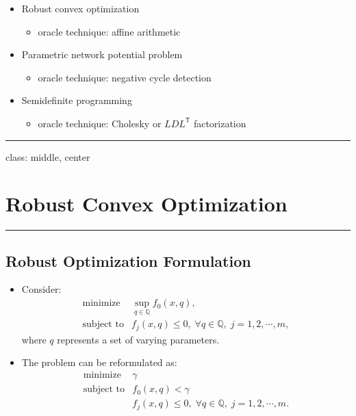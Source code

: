\documentclass[
]{article}
\providecommand{\tightlist}{%
  \setlength{\itemsep}{0pt}\setlength{\parskip}{0pt}}
\begin{document}
\begin{itemize}
\tightlist
\item
  Robust convex optimization

  \begin{itemize}
  \tightlist
  \item
    oracle technique: affine arithmetic
  \end{itemize}
\item
  Parametric network potential problem

  \begin{itemize}
  \tightlist
  \item
    oracle technique: negative cycle detection
  \end{itemize}
\item
  Semidefinite programming

  \begin{itemize}
  \tightlist
  \item
    oracle technique: Cholesky or \(LDL^\mathsf{T}\) factorization
  \end{itemize}
\end{itemize}

\begin{center}\rule{0.5\linewidth}{0.5pt}\end{center}

class: middle, center

\section{Robust Convex Optimization}\label{robust-convex-optimization}

\begin{center}\rule{0.5\linewidth}{0.5pt}\end{center}

\subsection{Robust Optimization
Formulation}\label{robust-optimization-formulation}

\begin{itemize}
\item
  Consider: \[\begin{array}{ll}
    \text{minimize}   & \sup_{q \in \mathbb Q} f_0(x,q), \\
    \text{subject to} & f_j(x,q) \leq 0, \;
     \forall q \in {\mathbb Q}, \; j = 1,2,\cdots,m,
  \end{array}\] where \(q\) represents a set of varying parameters.
\item
  The problem can be reformulated as: \[\begin{array}{ll}
    \text{minimize}   & \gamma \\
    \text{subject to} & f_0(x,q) < \gamma  \\
    & f_j(x,q) \leq 0, \;
     \forall q \in {\mathbb Q}, \; j = 1,2,\cdots,m.
  \end{array}\]
\end{itemize}
\end{document}
